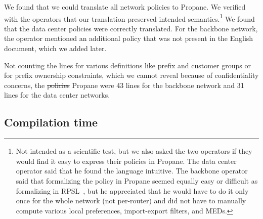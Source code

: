 \documentclass{sig-alternate-10pt}
\newcommand{\sysname}{{\small \sf Propane}\xspace}
\providecommand{\DIFadd}[1]{{\protect\color{blue}\uwave{#1}}} %
\providecommand{\DIFdel}[1]{{\protect\color{red}\sout{#1}}}                      %
\providecommand{\DIFaddbegin}{} %
\providecommand{\DIFaddend}{} %
\providecommand{\DIFdelbegin}{} %
\providecommand{\DIFdelend}{} %
\begin{document}
We found that we could translate all network policies to \sysname. We verified with the operators that our translation preserved intended semantics.\footnote{Not intended as a scientific test, but we also asked the two operators if they would find it easy to express their policies in \sysname. The data center operator said that he found the language intuitive. The backbone operator said that formalizing the policy in \sysname seemed equally easy or difficult as formalizing in RPSL~\cite{RFC2622}, but he appreciated that he would have to do it only once for the whole network (not per-router) and did not have to manually compute various local preferences, import-export filters, and MEDs.} We found that the data center policies were correctly translated. For the backbone network, the operator mentioned an additional policy that was not present in the English document, which we added later.

Not counting the lines for various definitions like prefix and customer groups or for prefix ownership constraints, which we cannot reveal because of confidentiality concerns, the \DIFdelbegin %
\DIFdel{policies }\DIFdelend \DIFaddbegin \DIFadd{routing policies for }\sysname \DIFaddend were 43 lines for the backbone network and 31 lines for the data center networks.


\subsection{Compilation time}



\end{document}
